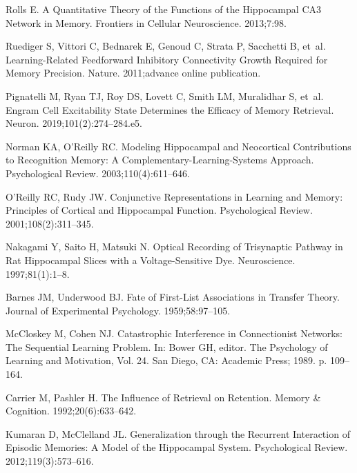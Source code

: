 \documentclass[10pt,letterpaper]{article}
\begin{document}
\begin{thebibliography}{10}
  Rolls E.
  \newblock A Quantitative Theory of the Functions of the Hippocampal {{CA3}}
    Network in Memory.
  \newblock Frontiers in Cellular Neuroscience. 2013;7:98.
  
  Ruediger S, Vittori C, Bednarek E, Genoud C, Strata P, Sacchetti B, et~al.
  \newblock Learning-Related Feedforward Inhibitory Connectivity Growth Required
    for Memory Precision.
  \newblock Nature. 2011;advance online publication.
  
  Pignatelli M, Ryan TJ, Roy DS, Lovett C, Smith LM, Muralidhar S, et~al.
  \newblock Engram {{Cell Excitability State Determines}} the {{Efficacy}} of
    {{Memory Retrieval}}.
  \newblock Neuron. 2019;101(2):274--284.e5.
  
  Norman KA, O'Reilly RC.
  \newblock Modeling Hippocampal and Neocortical Contributions to Recognition
    Memory: A Complementary-Learning-Systems Approach.
  \newblock Psychological Review. 2003;110(4):611--646.
  
  O'Reilly RC, Rudy JW.
  \newblock Conjunctive {{Representations}} in {{Learning}} and {{Memory}}:
    {{Principles}} of {{Cortical}} and {{Hippocampal Function}}.
  \newblock Psychological Review. 2001;108(2):311--345.
  
  Nakagami Y, Saito H, Matsuki N.
  \newblock Optical Recording of Trisynaptic Pathway in Rat Hippocampal Slices
    with a Voltage-Sensitive Dye.
  \newblock Neuroscience. 1997;81(1):1--8.
  
  Barnes JM, Underwood BJ.
  \newblock Fate of First-List Associations in Transfer Theory.
  \newblock Journal of Experimental Psychology. 1959;58:97--105.
  
  McCloskey M, Cohen NJ.
  \newblock Catastrophic {{Interference}} in {{Connectionist Networks}}: {{The
    Sequential Learning Problem}}.
  \newblock In: Bower GH, editor. The {{Psychology}} of {{Learning}} and
    {{Motivation}}, {{Vol}}. 24. {San Diego, CA}: {Academic Press}; 1989. p.
    109--164.
  
  Carrier M, Pashler H.
  \newblock The Influence of Retrieval on Retention.
  \newblock Memory \& Cognition. 1992;20(6):633--642.
  
  Kumaran D, McClelland JL.
  \newblock Generalization through the Recurrent Interaction of Episodic
    Memories: A Model of the Hippocampal System.
  \newblock Psychological Review. 2012;119(3):573--616.
  

\end{thebibliography}
\end{document}
